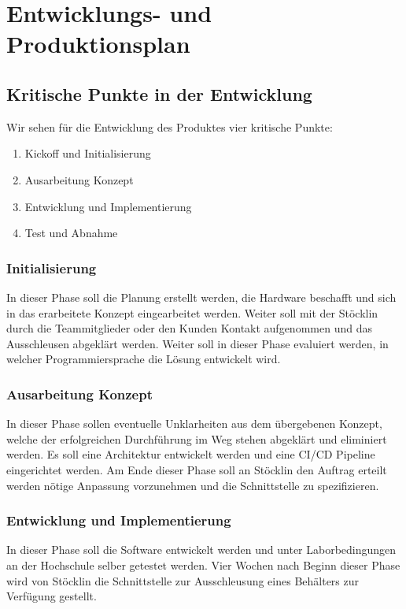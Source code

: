 \chapter{Entwicklungs- und Produktionsplan}

\section{Kritische Punkte in der Entwicklung}
Wir sehen für die Entwicklung des Produktes vier kritische Punkte:
\begin{enumerate}
	\item Kickoff und Initialisierung
	\item Ausarbeitung Konzept
	\item Entwicklung und Implementierung
	\item Test und Abnahme
\end{enumerate}

\subsection{Initialisierung}
In dieser Phase soll die Planung erstellt werden, die Hardware beschafft und sich in das erarbeitete Konzept eingearbeitet werden. Weiter soll mit der Stöcklin durch die Teammitglieder oder den Kunden Kontakt aufgenommen und das Ausschleusen abgeklärt werden. Weiter soll in dieser Phase evaluiert werden, in welcher Programmiersprache die Lösung entwickelt wird.

\subsection{Ausarbeitung Konzept}
In dieser Phase sollen eventuelle Unklarheiten aus dem übergebenen Konzept, welche der erfolgreichen Durchführung im Weg stehen abgeklärt und eliminiert werden. Es soll eine Architektur entwickelt werden und eine CI/CD Pipeline eingerichtet werden. Am Ende dieser Phase soll an Stöcklin den Auftrag erteilt werden nötige Anpassung vorzunehmen und die Schnittstelle zu spezifizieren.

\subsection{Entwicklung und Implementierung}
In dieser Phase soll die Software entwickelt werden und unter Laborbedingungen an der Hochschule selber getestet werden. Vier Wochen nach Beginn dieser Phase wird von Stöcklin die Schnittstelle zur Ausschleusung eines Behälters zur Verfügung gestellt.

